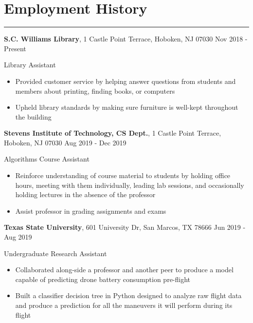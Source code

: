 \documentclass[10pt]{article}
\newcommand{\resumesection}[1]{\vspace{-0.2cm}\section*{#1}\vspace{-0.2cm}\hrule\vspace{0.2cm}}
\begin{document}




\resumesection{Employment History}
\textbf{S.C. Williams Library}, 1 Castle Point Terrace, Hoboken, NJ 07030 \hfill Nov 2018 - Present\par
Library Assistant
\begin{itemize}
	\item Provided customer service by helping answer questions from students and members about printing, finding books, or computers
	\item Upheld library standards by making sure furniture is well-kept throughout the building
\end{itemize}

\textbf{Stevens Institute of Technology, CS Dept.}, 1 Castle Point Terrace, Hoboken, NJ 07030 \hfill Aug 2019 - Dec 2019\par
Algorithms Course Assistant
\begin{itemize}
	\item Reinforce understanding of course material to students by holding office hours, meeting with them individually, leading lab sessions, and occasionally holding lectures in the absence of the professor
	\item Assist professor in grading assignments and exams
\end{itemize}

\textbf{Texas State University}, 601 University Dr, San Marcos, TX 78666 \hfill Jun 2019 - Aug 2019\par
Undergraduate Research Assistant
\begin{itemize}
	\item Collaborated along-side a professor and another peer to produce a model capable of predicting drone battery consumption pre-flight
	\item Built a classifier decision tree in Python designed to analyze raw flight data and produce a prediction for all the maneuvers it will perform during its flight
\end{itemize}
\end{document}

